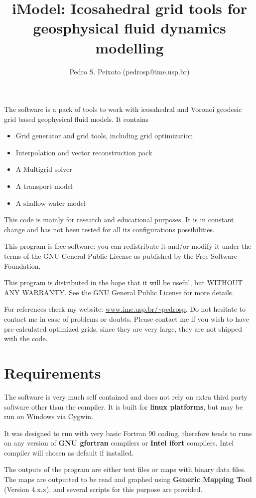 \documentclass[a4paper,10pt]{article}
\title{iModel: Icosahedral grid tools for geosphysical fluid dynamics modelling}
\author{Pedro S. Peixoto (pedrosp@ime.usp.br)}
\begin{document}
\maketitle

The software is a pack of tools to work with icosahedral and Voronoi geodesic grid based geophysical fluid models. It contains
\begin{itemize}
 \item Grid generator and grid tools, including grid optimization
 \item Interpolation and vector reconstruction pack
  \item A Multigrid solver
 \item A transport model
 \item A shallow water model 
\end{itemize}



This code is mainly for research and educational purposes. It is in constant change and has not been tested for all its configurations possibilities. 

    This program is free software: you can redistribute it and/or modify
    it under the terms of the GNU General Public License as published by
    the Free Software Foundation.

    This program is distributed in the hope that it will be useful,
    but WITHOUT ANY WARRANTY. See the GNU General Public License for more details.


For references check my website: \url{www.ime.usp.br/~pedrosp}. Do not hesitate to contact me in case of problems or doubts. Please contact me if you wish to have pre-calculated optimized grids, since they are very large, they are not shipped with the code.


\section{Requirements}

The software is very much self contained and does not rely on extra third party software other than the compiler. It is built for \textbf{linux platforms}, but may be run on Windows via Cygwin.

It was designed to run with very basic Fortran 90 coding, therefore tends to runs on any version of \textbf{GNU gfortran} compilers or \textbf{Intel ifort} compilers. Intel compiler will chosen as default if installed.

The outputs of the program are either text files or maps with binary data files. The maps are outputted to be read and graphed using \textbf{Generic Mapping Tool} (Version 4.x.x), and several scripts for this purpose are provided.
\end{document}
